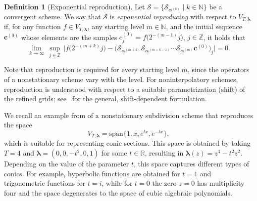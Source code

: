 \documentclass[11pt,a4paper]{article}
\newcommand{\N}{\mathbb{N}}
\theoremstyle{definition}
\newtheorem{definition}[theorem]{Definition}
\begin{document}
\begin{definition} [Exponential reproduction] \label{def:exponential_reproduction}
Let $\boldsymbol{\mathcal{S}}=\{\mathcal{S}_{\boldsymbol{\alpha}^{(k)}} \mid k\in \N \}$ be a convergent scheme. We say that $\boldsymbol{\mathcal{S}}$ is \emph{exponential reproducing} with respect to $V_{T,\boldsymbol{\lambda}}$ if, for any function $f \in V_{T,\boldsymbol{\lambda}}$, any starting level $m \in \N$, and the initial sequence $\boldsymbol{c}^{(0)}$ whose elements are the samples $c^{(0)}_j=f\big(2^{-(m-1)}j\big)$, $j\in\mathbb{Z}$, it holds that
\begin{equation}
    \lim_{k\rightarrow\infty} \, \sup_{j\in\mathbb{Z}} \, \Big| f\big(2^{-(m+k)}j\big) - \big( \mathcal{S}_{\boldsymbol{\alpha}^{(m+k)}} \mathcal{S}_{\boldsymbol{\alpha}^{(m+k-1)}} \cdots \mathcal{S}_{\boldsymbol{\alpha}^{(m)}} \boldsymbol{c}^{(0)} \big)_j \Big| = 0.
\end{equation}
\end{definition}
Note that reproduction is required for every starting level $m$, since the operators of a nonstationary scheme vary with the level. For noninterpolatory schemes, reproduction is understood with respect to a suitable parametrization (shift) of the refined grids; see~\cite{conti2011algebraic} for the general, shift-dependent formulation.

We recall an example from \cite{conti2011algebraic} of a nonstationary subdivision scheme that reproduces the space
\begin{equation*}
    V_{T,\boldsymbol{\lambda}} = \text{span}\{1, x, e^{tx}, e^{-tx}\},
\end{equation*}
which is suitable for representing conic sections. This space is obtained by taking $T=4$ and $\boldsymbol{\lambda}=(0, 0, -t^2,0, 1)$ for some $t\in\mathbb{R}$, resulting in $\boldsymbol{\lambda}(z)=z^4-t^2z^2$. Depending on the value of the parameter $t$, this space captures different types of conics. For example, hyperbolic functions are obtained for $t=1$ and trigonometric functions for $t=i$, while for $t=0$ the zero $z=0$ has multiplicity four and the space degenerates to the space of cubic algebraic polynomials.
\end{document}
